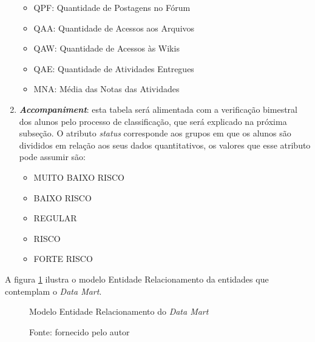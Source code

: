 \begin{enumerate}
\begin{itemize}
\item QPF: Quantidade de Postagens no Fórum
\item QAA: Quantidade de Acessos aos Arquivos
\item QAW: Quantidade de Acessos às Wikis
\item QAE: Quantidade de Atividades Entregues
\item MNA: Média das Notas das Atividades
\end{itemize}
\item \textbf{\textit{Accompaniment}}: esta tabela será alimentada com a verificação bimestral dos alunos pelo processo de classificação, que será explicado na próxima subseção. O atributo \textit{status} corresponde aos grupos em que os alunos são divididos em relação aos seus dados quantitativos, os valores que esse atributo pode assumir são:
\begin{itemize}
\item MUITO BAIXO RISCO
\item BAIXO RISCO
\item REGULAR
\item RISCO
\item FORTE RISCO
\end{itemize}
\end{enumerate}

A figura \ref{fig:modelodatawarehouse} ilustra o modelo Entidade Relacionamento da entidades que contemplam o \textit{Data Mart}.

\begin{figure}[!ht]
\caption{Modelo Entidade Relacionamento do \textit{Data Mart}}
\centering
{}
\caption*{Fonte: fornecido pelo autor}
\label{fig:modelodatawarehouse}
\end{figure}


